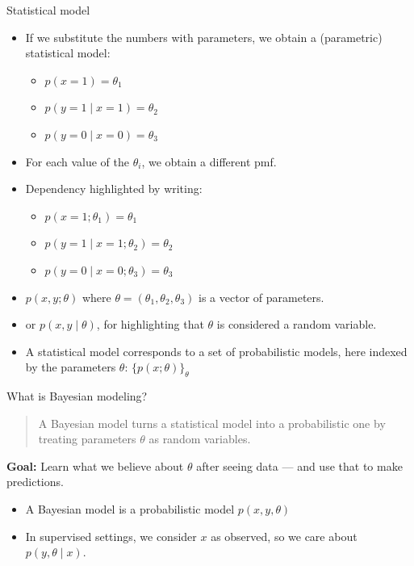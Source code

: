 \documentclass{beamer}
\begin{document}
\begin{frame}{Statistical model}
\begin{itemize}
  \item If we substitute the numbers with parameters, we obtain a (parametric) statistical model:
  \begin{itemize}
    \item $p(x = 1) = \theta_1$
    \item $p(y = 1 \mid x = 1) = \theta_2$
    \item $p(y = 0 \mid x = 0) = \theta_3$
  \end{itemize}
  \item For each value of the $\theta_i$, we obtain a different pmf.
  \item Dependency highlighted by writing:
  \begin{itemize}
    \item $p(x = 1; \theta_1) = \theta_1$
    \item $p(y = 1 \mid x = 1; \theta_2) = \theta_2$
    \item $p(y = 0 \mid x = 0; \theta_3) = \theta_3$
  \end{itemize}
\item $p(x, y; \theta)$ where $\theta = (\theta_1, \theta_2, \theta_3)$ is a vector of parameters.
\item or $p(x, y \mid \theta)$, for highlighting that $\theta$ is considered a random variable.

  \item A statistical model corresponds to a set of probabilistic models, here indexed by the parameters $\theta$: $\{p(x; \theta)\}_\theta$
\end{itemize}
\end{frame}

\begin{frame}{What is Bayesian modeling?}

\begin{quote}
A Bayesian model turns a statistical model into a probabilistic one by treating parameters $\theta$ as random variables.
\end{quote}

\vspace{0.5cm}
\textbf{Goal:} Learn what we believe about $\theta$ after seeing data — and use that to make predictions.

\vspace{0.5cm}
\begin{itemize}
\item A Bayesian model is a probabilistic model $p(x, y, \theta)$
\item In supervised settings, we consider $x$ as observed, so we care about $p(y, \theta \mid x)$.
\end{itemize}

\end{frame}
\end{document}
